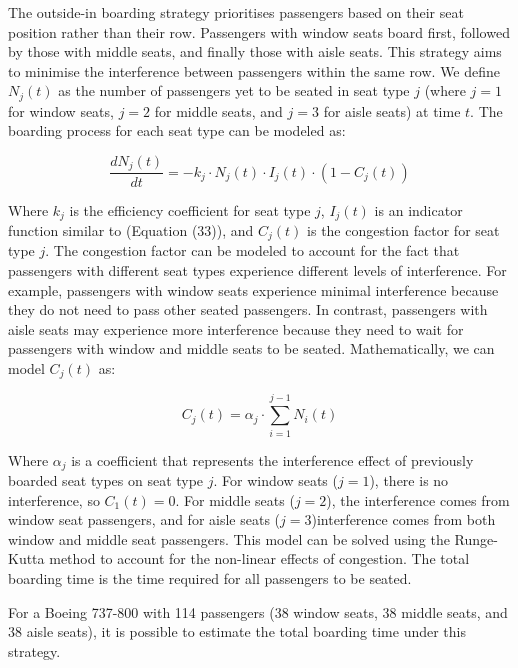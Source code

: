 \documentclass[12pt]{article}
\begin{document}
The outside-in boarding strategy prioritises passengers based on their seat position rather than their row. Passengers with window seats board first, followed by those with middle seats, and finally those with aisle seats. This strategy aims to minimise the interference between passengers within the same row. We define $N_j(t)$ as the number of passengers yet to be seated in seat type $j$ (where $j = 1$ for window seats, $j = 2$ for middle seats, and $j = 3$ for aisle seats) at time $t$. The boarding process for each seat type can be modeled as:

\begin{equation}
\frac{dN_j(t)}{dt} = -k_j \cdot N_j(t) \cdot I_j(t) \cdot (1 - C_j(t))
\end{equation}

Where $k_j$ is the efficiency coefficient for seat type $j$, $I_j(t)$ is an indicator function similar to (Equation (33)), and $C_j(t)$ is the congestion factor for seat type $j$. The congestion factor can be modeled to account for the fact that passengers with different seat types experience different levels of interference. For example, passengers with window seats experience minimal interference because they do not need to pass other seated passengers. In contrast, passengers with aisle seats may experience more interference because they need to wait for passengers with window and middle seats to be seated. Mathematically, we can model $C_j(t)$ as:

\begin{equation}
C_j(t) = \alpha_j \cdot \sum_{i=1}^{j-1} N_i(t)
\end{equation}

Where $\alpha_j$ is a coefficient that represents the interference effect of previously boarded seat types on seat type $j$. For window seats ($j = 1$), there is no interference, so $C_1(t) = 0$. For middle seats ($j = 2$), the interference comes from window seat passengers, and for aisle seats ($j = 3$)interference comes from both window and middle seat passengers. This model can be solved using the Runge-Kutta method to account for the non-linear effects of congestion. The total boarding time is the time required for all passengers to be seated.

For a Boeing 737-800 with 114 passengers (38 window seats, 38 middle seats, and 38 aisle seats), it is possible to estimate the total boarding time under this strategy.
\end{document}
